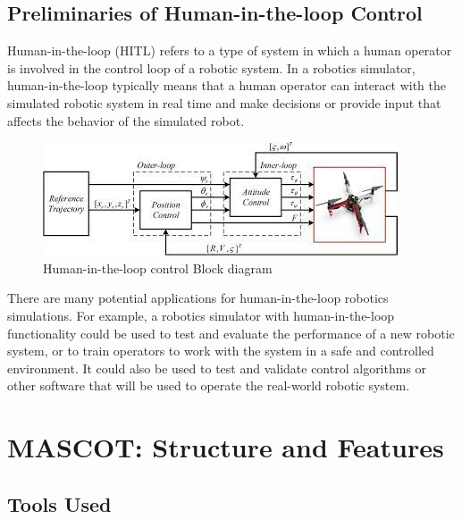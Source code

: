 \documentclass[letterpaper, 10 pt, conference]{ieeeconf}
\begin{document}
\subsection{Preliminaries of Human-in-the-loop Control}
Human-in-the-loop (HITL) refers to a type of system in which a human operator is involved in the control loop of a robotic system. In a robotics simulator, human-in-the-loop typically means that a human operator can interact with the simulated robotic system in real time and make decisions or provide input that affects the behavior of the simulated robot.
\begin{figure}[!ht]
    \centering
    \includegraphics[scale=0.60]{HITL.jpeg}
    \caption{Human-in-the-loop control Block diagram}
    \label{Fig: HITL}
\end{figure}
There are many potential applications for human-in-the-loop robotics simulations. For example, a robotics simulator with human-in-the-loop functionality could be used to test and evaluate the performance of a new robotic system, or to train operators to work with the system in a safe and controlled environment. It could also be used to test and validate control algorithms or other software that will be used to operate the real-world robotic system.





\section{MASCOT: Structure and Features}\label{sec:mascot}



\subsection{Tools Used}\label{subsec:tools}
\end{document}
